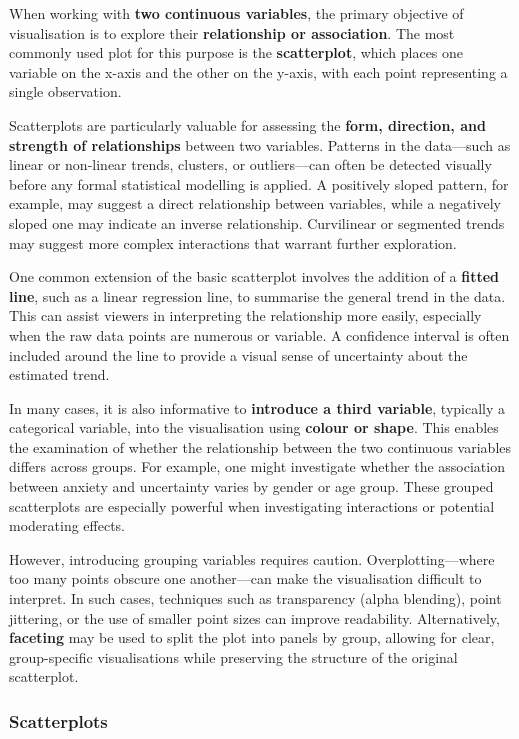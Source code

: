 \documentclass[
  oneside]{book}
\begin{document}
When working with \textbf{two continuous variables}, the primary objective of visualisation is to explore their \textbf{relationship or association}. The most commonly used plot for this purpose is the \textbf{scatterplot}, which places one variable on the x-axis and the other on the y-axis, with each point representing a single observation.

Scatterplots are particularly valuable for assessing the \textbf{form, direction, and strength of relationships} between two variables. Patterns in the data---such as linear or non-linear trends, clusters, or outliers---can often be detected visually before any formal statistical modelling is applied. A positively sloped pattern, for example, may suggest a direct relationship between variables, while a negatively sloped one may indicate an inverse relationship. Curvilinear or segmented trends may suggest more complex interactions that warrant further exploration.

One common extension of the basic scatterplot involves the addition of a \textbf{fitted line}, such as a linear regression line, to summarise the general trend in the data. This can assist viewers in interpreting the relationship more easily, especially when the raw data points are numerous or variable. A confidence interval is often included around the line to provide a visual sense of uncertainty about the estimated trend.

In many cases, it is also informative to \textbf{introduce a third variable}, typically a categorical variable, into the visualisation using \textbf{colour or shape}. This enables the examination of whether the relationship between the two continuous variables differs across groups. For example, one might investigate whether the association between anxiety and uncertainty varies by gender or age group. These grouped scatterplots are especially powerful when investigating interactions or potential moderating effects.

However, introducing grouping variables requires caution. Overplotting---where too many points obscure one another---can make the visualisation difficult to interpret. In such cases, techniques such as transparency (alpha blending), point jittering, or the use of smaller point sizes can improve readability. Alternatively, \textbf{faceting} may be used to split the plot into panels by group, allowing for clear, group-specific visualisations while preserving the structure of the original scatterplot.

\subsubsection{Scatterplots}\label{scatterplots}
\end{document}
